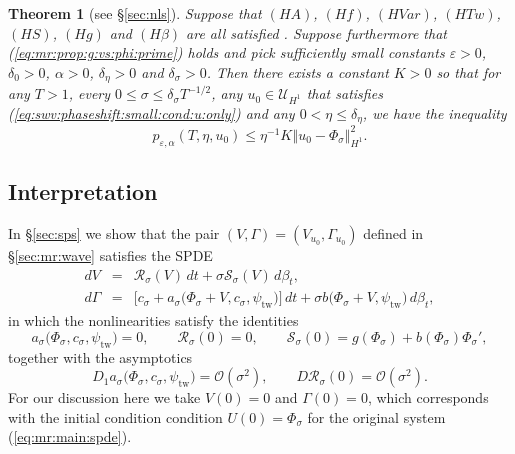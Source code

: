 \documentclass[10pt]{articleHJ}
\newcommand{\e}{\ensuremath{\varepsilon}}
\renewcommand{\O}{\ensuremath{\mathcal{O}}}
\newcommand{\norm}[1]{\left\Vert#1\right\Vert}		%
\newcommand{\sref}[1]{(\ref{#1})}                       %
\newtheorem{thm}{Theorem}[section]
\numberwithin{equation}{section}
\begin{document}
\begin{thm}[{see \S\ref{sec:nls}}]
\label{thm:mr:exp:stb}
Suppose that $(HA)$, $(Hf)$, $(HVar)$,
$(HTw)$, $(HS)$, $(Hg)$ and $(H\beta)$ are all satisfied .
%
Suppose furthermore that
\sref{eq:mr:prop:g:vs:phi:prime} holds
and pick sufficiently small constants $\e > 0$, $\delta_0>0$,
$\alpha > 0$,
$\delta_{\eta} > 0$ and $\delta_{\sigma} > 0$.
%
Then there exists a constant $K > 0$
so that for any $T > 1$,
every $0 \le \sigma \le \delta_{\sigma}T^{-1/2}$,
any $u_0 \in \mathcal{U}_{H^1}$
that satisfies \sref{eq:swv:phaseshift:small:cond:u:only}
and any $0 < \eta \le \delta_{\eta}$,
we have the inequality
\begin{equation}
 p_{\e,\alpha}(T, \eta, u_0)
  \le   \eta^{-1} K\norm{u_0 - \Phi_{\sigma}}_{H^1}^2 .
\end{equation}
\end{thm}





\subsection{Interpretation}
\label{sec:mr:disc}

In \S\ref{sec:sps}
we show that
the pair $(V, \Gamma) = (V_{u_0} , \Gamma_{u_0} )$
defined in \S\ref{sec:mr:wave}
satisfies the SPDE
\begin{equation}
\label{eq:mr:disc:main:spde}
\begin{array}{lcl}
d V  & = & \mathcal{R}_{\sigma}(V) \, dt + \sigma \mathcal{S}_{\sigma}(V) \, d \beta_t ,
\\[0.2cm]
d \Gamma & = &
  \big[
  c_{\sigma}
+ a_{\sigma}\big(\Phi_{\sigma} + V, c_{\sigma} ,
    \psi_{\mathrm{tw}} \big) \big] \, dt
    + \sigma b \big(\Phi_{\sigma} + V ,
          \psi_{\mathrm{tw}} \big) \, d \beta_t ,
\end{array}
\end{equation}
in which the nonlinearities satisfy
the identities
\begin{equation}
\label{eq:mr:disc:ids}
a_{\sigma}\big( \Phi_{\sigma} , c_{\sigma}, \psi_{\mathrm{tw}} \big) = 0,
\qquad
\mathcal{R_{\sigma} }(0) = 0,
\qquad
\mathcal{S_{\sigma} }(0) = g(\Phi_{\sigma}) + b (\Phi_{\sigma} ) \Phi_{\sigma}' ,
\end{equation}
together with the asymptotics
\begin{equation}
\label{eq:mr:disc:asymp:nl}
D_1 a_{\sigma}\big( \Phi_{\sigma} , c_{\sigma}, \psi_{\mathrm{tw}} \big)
= \O(\sigma^2),
\qquad
D\mathcal{R}_{\sigma}(0) = \O(\sigma^2) .
\end{equation}
For our discussion here  we take $V(0) = 0$ and $\Gamma(0) = 0$,
which corresponds with the initial condition
condition $U(0) = \Phi_{\sigma}$
for the original system \sref{eq:mr:main:spde}.
\end{document}

